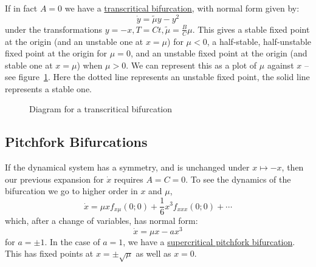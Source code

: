 \documentclass[../Main.tex]{subfiles}
\begin{document}
If in fact $A = 0$ we have a \underline{transcritical bifurcation}, with normal form given by:
\begin{equation*}
    \dot{y} = \tilde{\mu} y - y^2
\end{equation*}
under the transformations $y = -x, T = Ct, \tilde\mu = \frac B C \mu$. This gives a stable fixed point at the origin (and an unstable one at $x = \mu$) for $\mu < 0$, a half-stable, half-unstable fixed point at the origin for $\mu = 0$, and an unstable fixed point at the origin (and stable one at $x = \mu$) when $\mu > 0$. We can represent this as a plot of $\mu$ against $x$ -- see figure~\ref{figTranscritBif}. Here the dotted line represents an unstable fixed point, the solid line represents a stable one.
\begin{figure}
    \centering
    \caption{Diagram for a transcritical bifurcation}
    \label{figTranscritBif}
\end{figure}

\subsection{Pitchfork Bifurcations}
If the dynamical system has a symmetry, and is unchanged under $x \mapsto -x$, then our previous expansion for $\dot{x}$ requires $A = C = 0$. To see the dynamics of the bifurcation we go to higher order in $x$ and $\mu$,
\begin{equation*}
    \dot{x} = \mu x f_{x\mu}(0;0) + \frac16 x^3 f_{xxx}(0;0) + \cdots
\end{equation*}
which, after a change of variables, has normal form:
\begin{equation*}
    \dot{x} = \mu x - ax^3
\end{equation*}
for $a = \pm 1$. In the case of $a = 1$, we have a \underline{supercritical pitchfork bifurcation}. This has fixed points at $x = \pm \sqrt{\mu}$ as well as $x = 0$.
\end{document}
